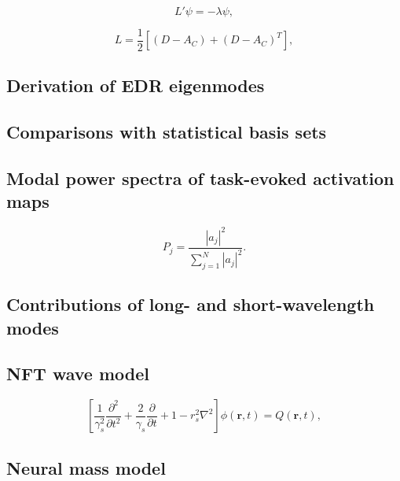 \documentclass[sn-mathphys-num]{sn-jnl}%
\theoremstyle{thmstyleone}%
\theoremstyle{thmstyletwo}%
\theoremstyle{thmstylethree}%
\begin{document}
\begin{equation}\label{eq:connectome_eigenmodes}
	L' \psi = - \lambda \psi,
\end{equation}


\begin{equation}\label{eq:unnormalized_Laplacian}
	L = \frac{1}{2} [ (D-A_C) + (D-A_C)^T ],
\end{equation}


\subsection{Derivation of EDR eigenmodes} \label{sec:EDR_derivation}


\subsection{Comparisons with statistical basis sets} \label{sec:sets_comparisons}


\subsection{Modal power spectra of task-evoked activation maps} \label{sec:modal_power}


\begin{equation}\label{eq:normalized_power}
	P_j = \frac{|a_j|^2}{\sum_{j=1}^{N} |a_j|^2 }.
\end{equation}


\subsection{Contributions of long- and short-wavelength modes} \label{sec:wavelength_contributions}


\subsection{NFT wave model} \label{sec:NFT_model}


\begin{equation}\label{eq:NFT_wave_model}
	[\frac{1}{\gamma_s^2} \frac{\partial ^2}{\partial t^2} + 
	\frac{2}{\gamma_s} \frac{\partial}{\partial t} + 1 - r_s^2 \nabla^2] 
	\phi(\textbf{r}, t) = Q(\textbf{r}, t),
\end{equation}


\subsection{Neural mass model} \label{sec:neural_mass} 
\end{document}

